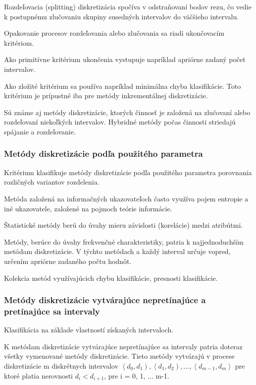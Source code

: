 Rozdeľovacia (splitting) diskretizácia spočíva v odstraňovaní bodov rezu, čo vedie k postupnému zlučovaniu skupiny susedných intervalov do väčšieho intervalu. 

Opakovanie procesov rozdeľovania alebo zlučovania sa riadi ukončovacím kritériom. 

Ako primitívne kritérium ukončenia vystupuje napríklad apriórne zadaný počet intervalov. 

Ako zložité kritérium sa používa napríklad minimálna chyba klasifikácie. Toto kritérium je prípustné iba pre metódy inkrementálnej diskretizácie. 

Sú známe aj metódy diskretizácie, ktorých činnosť je založená na zlučovaní alebo rozdeľovaní niekoľkých intervalov. 
Hybridné metódy počas činnosti striedajú spájanie a rozdeľovanie. \cite{levashenkoProj}

\subsubsection{Metódy diskretizácie podľa použitého parametra}
Kritérium klasifikuje metódy diskretizácie podľa použitého parametra porovnania rozličných variantov rozdelenia. 

Metóda založená na informačných ukazovateľoch často využíva pojem entropie a iné ukazovatele, založené na pojmoch teórie informácie. 

Štatistické metódy berú do úvahy mieru závislosti (korelácie) medzi atribútmi. 

Metódy, berúce do úvahy frekvenčné charakteristiky, patria k najjednoduchším metódam diskretizácie. V týchto metódach a každý interval určuje vopred, určením apriórne zadaného počtu hodnôt. 

Kolekcia metód využívajúcich chybu klasifikácie, presnosti klasifikácie. \cite{levashenkoProj}

\subsubsection{Metódy diskretizácie vytvárajúce nepretínajúce a pretínajúce sa intervaly}
Klasifikácia na základe vlastností získaných intervaloch. 

K metódam diskretizácie vytvárajúce nepretínajúce sa intervaly patria doteraz všetky vymenované metódy diskretizácie. Tieto metódy vytvárajú v procese diskretizácie m diskrétnych intervalov
$
\left\langle d_0, d_1 \right) , 
\left\langle d_1, d_2 \right) , ... , 
\left\langle d_{m-1}, d_m \right\rangle 
$
pre ktoré platia nerovnosti $d_i < d_{i+1}$, pre i = 0, 1, ... m-1. 

